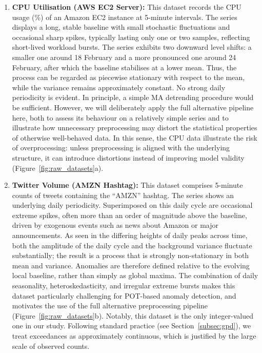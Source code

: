 \documentclass{statsmsc}
\begin{document}
\begin{enumerate}
    \item \textbf{CPU Utilisation (AWS EC2 Server):} 
    This dataset records the CPU usage (\%) of an Amazon EC2 instance at 5-minute intervals. 
    The series displays a long, stable baseline with small stochastic fluctuations and occasional sharp spikes, 
    typically lasting only one or two samples, reflecting short-lived workload bursts. 
    The series exhibits two downward level shifts: a smaller one around 18 February and a more pronounced one 
    around 24 February, after which the baseline stabilises at a lower mean.
    Thus, the process can be regarded as piecewise stationary with respect to the mean, 
    while the variance remains approximately constant. No strong daily periodicity is evident. 
    In principle, a simple MA detrending procedure would be sufficient. However, we will deliberately apply the full 
    alternative pipeline here, both to assess its behaviour on a relatively simple series and to illustrate how unnecessary
    preprocessing may distort the statistical properties of otherwise well-behaved data.
    In this sense, the CPU data illustrate the risk of overprocessing: unless preprocessing is aligned with the underlying
    structure, it can introduce distortions instead of improving model validity (Figure~\ref{fig:raw_datasets}a).
    \item \textbf{Twitter Volume (AMZN Hashtag):} 
    This dataset comprises 5-minute counts of tweets containing the ``AMZN'' hashtag. 
    The series shows an underlying daily periodicity. Superimposed on this daily cycle are occasional extreme spikes, 
    often more than an order of magnitude above the baseline, driven by exogenous events such as news about Amazon 
    or major announcements. As seen in the differing heights of daily peaks across time, both the amplitude of the 
    daily cycle and the background variance fluctuate substantially; the result is a process that is strongly non-stationary 
    in both mean and variance. Anomalies are therefore defined relative to the evolving local baseline, rather than 
    simply as global maxima. The combination of daily seasonality, heteroskedasticity, and irregular extreme bursts 
    makes this dataset particularly challenging for POT-based anomaly detection, and motivates the use of the full 
    alternative preprocessing pipeline (Figure~\ref{fig:raw_datasets}b). Notably, this dataset is the only integer-valued
    one in our study. Following standard practice (see Section~\ref{subsec:gpd}), 
    we treat exceedances as approximately continuous, which is justified by the large scale of observed counts. 

\end{enumerate}
\end{document}
